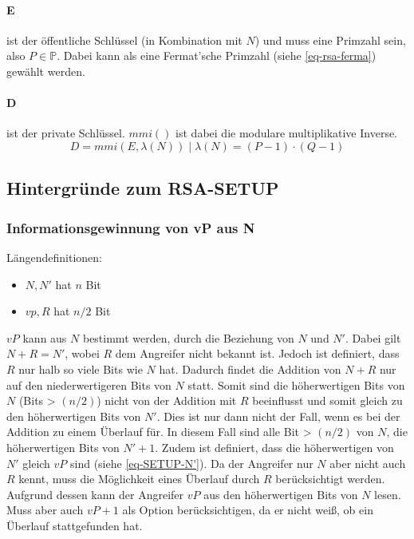            \paragraph{E} ist der öffentliche Schlüssel (in Kombination mit $N$) und muss eine Primzahl sein, also $P \in \mathbb{P}$. Dabei kann als eine Fermat'sche Primzahl (siehe \ref{eq-rsa-ferma}) gewählt werden.

            \paragraph{D} ist der private Schlüssel. $mmi()$ ist dabei die modulare multiplikative Inverse.
            \begin{equation}
                D = mmi(E, \lambda(N)) \mid \lambda(N) = (P-1)\cdot(Q-1)
            \end{equation}



        \subsection{Hintergründe zum RSA-SETUP}
            \subsubsection{Informationsgewinnung von vP aus N} \label{sec-SETUP-vP_from_N}
            Längendefinitionen:
            \begin{itemize}
                \item $N, N'$ hat $n$ Bit
                \item $vp, R$ hat $n/2$ Bit
            \end{itemize}
            $vP$ kann aus $N$ bestimmt werden, durch die Beziehung von $N$ und $N'$. Dabei gilt $N + R = N'$, wobei $R$ dem Angreifer nicht bekannt ist. Jedoch ist definiert, dass $R$ nur halb so viele Bits wie $N$ hat. Dadurch findet die Addition von $N + R$ nur auf den niederwertigeren Bits von $N$ statt. Somit sind die höherwertigen Bits von $N$ (Bits > $(n/2)$) nicht von der Addition mit $R$ beeinflusst und somit gleich zu den höherwertigen Bits von $N'$. Dies ist nur dann nicht der Fall, wenn es bei der Addition zu einem Überlauf für. In diesem Fall sind alle Bit > $(n/2)$ von $N$, die höherwertigen Bits von $N' + 1$.
            Zudem ist definiert, dass die höherwertigen von $N'$ gleich $vP$ sind (siehe \ref{eq-SETUP-N'}).
            Da der Angreifer nur $N$ aber nicht auch $R$ kennt, muss die Möglichkeit eines Überlauf durch $R$ berücksichtigt werden. 
            Aufgrund dessen kann der Angreifer $vP$ aus den höherwertigen Bits von $N$ lesen. Muss aber auch $vP + 1$ als Option berücksichtigen, da er nicht weiß, ob ein Überlauf stattgefunden hat.               

